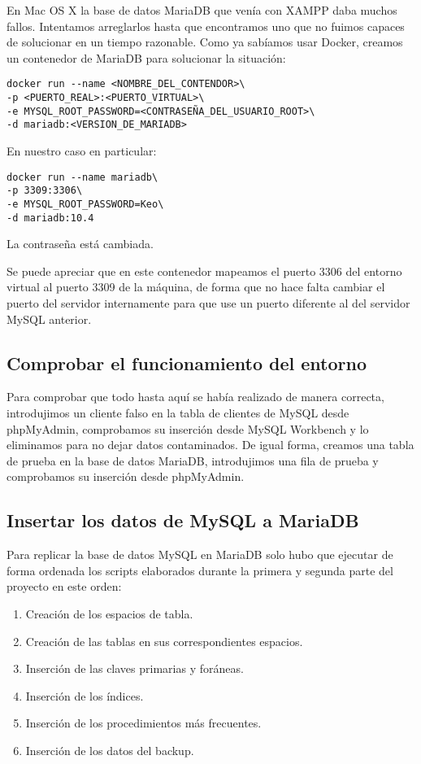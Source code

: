 \documentclass[a4paper, 11pt, oneside]{article} %
\begin{document}
En Mac OS X la base de datos MariaDB que venía con XAMPP daba muchos fallos. Intentamos arreglarlos hasta que encontramos uno que no fuimos capaces de solucionar en un tiempo razonable. Como ya sabíamos usar Docker, creamos un contenedor de MariaDB para solucionar la situación:

\begin{verbatim}
docker run --name <NOMBRE_DEL_CONTENDOR>\
-p <PUERTO_REAL>:<PUERTO_VIRTUAL>\
-e MYSQL_ROOT_PASSWORD=<CONTRASEÑA_DEL_USUARIO_ROOT>\
-d mariadb:<VERSION_DE_MARIADB>
\end{verbatim}

En nuestro caso en particular:

\begin{verbatim}
docker run --name mariadb\
-p 3309:3306\
-e MYSQL_ROOT_PASSWORD=Keo\
-d mariadb:10.4
\end{verbatim}

La contraseña está cambiada.

Se puede apreciar que en este contenedor mapeamos el puerto 3306 del entorno virtual al puerto 3309 de la máquina, de forma que no hace falta cambiar el puerto del servidor internamente para que use un puerto diferente al del servidor MySQL anterior.




\subsection{Comprobar el funcionamiento del entorno}

Para comprobar que todo hasta aquí se había realizado de manera correcta, introdujimos un cliente falso en la tabla de clientes de MySQL desde phpMyAdmin, comprobamos su inserción desde MySQL Workbench y lo eliminamos para no dejar datos contaminados. De igual forma, creamos una tabla de prueba en la base de datos MariaDB, introdujimos una fila de prueba y comprobamos su inserción desde phpMyAdmin.




\subsection{Insertar los datos de MySQL a MariaDB}

Para replicar la base de datos MySQL en MariaDB solo hubo que ejecutar de forma ordenada los scripts elaborados durante la primera y segunda parte del proyecto en este orden:

\begin{enumerate}
	\item Creación de los espacios de tabla.
	\item Creación de las tablas en sus correspondientes espacios.
	\item Inserción de las claves primarias y foráneas.
	\item Inserción de los índices.
	\item Inserción de los procedimientos más frecuentes.
	\item Inserción de los datos del backup.
\end{enumerate}
\end{document}
